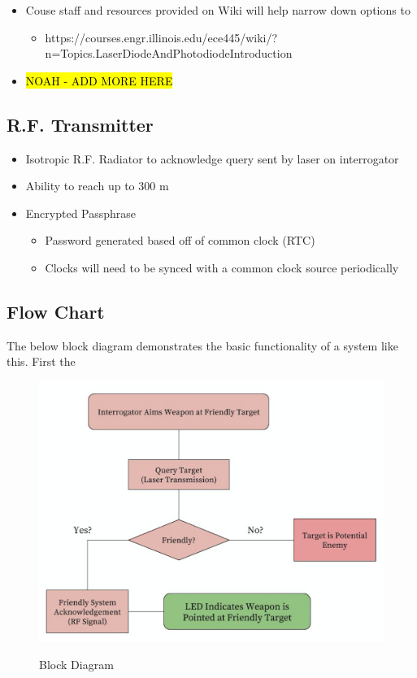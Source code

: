\documentclass[openbib,letterpaper,10pt]{article}
\begin{document}
\begin{spacing}{1.15}
\begin{itemize}
	\item Couse staff and resources provided on Wiki will help narrow down options to 
	\begin{itemize}
		\item https://courses.engr.illinois.edu/ece445/wiki/?n=Topics.LaserDiodeAndPhotodiodeIntroduction
	\end{itemize}
	\item \hl{NOAH - ADD MORE HERE}
\end{itemize}
 
 \subsection*{{\normalsize  R.F. Transmitter}}
  \begin{itemize}
  	\item Isotropic R.F. Radiator to acknowledge query sent by laser on interrogator
  	\item Ability to reach up to 300 m 
  	\item Encrypted Passphrase
  	\begin{itemize}
  		\item Password generated based off of common clock (RTC)
  		\item Clocks will need to be synced with a common clock source periodically
  	\end{itemize}
  \end{itemize}
 

  \clearpage

\subsection{Flow Chart}
The below block diagram demonstrates the basic functionality of a system like this. First the 

\begin{figure} [H]
	\centering
	\includegraphics[scale=0.5]{Block_Diagram.png}
	\label{fig:block-diagram}
	\caption{Block Diagram}
\end{figure}



\end{spacing}
\end{document}
